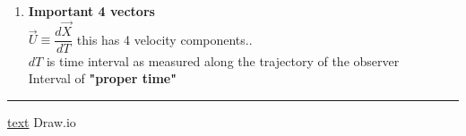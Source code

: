 \documentclass[11pt,a4paper]{article}
\begin{document}
\begin{enumerate}
\begin{enumerate}
\begin{enumerate}
                              \item \textbf{Important 4 vectors}\\
                              $\vec{U}\equiv  \dfrac{d\vec{X}}{dT}$ this has 4 velocity components..\\
                              $dT$ is time interval as measured along the trajectory of the observer \\
                              Interval of \textbf{"proper time"}\\
                              
                    \end{enumerate}
          \end{enumerate}
\end{enumerate}
\noindent\rule{\textwidth}{1pt}
\href{https://youtu.be/TiHHz3sKDbY?list=PL6Q1107aDr%SgQ1DBEugejXLfQX76hfSnX&t=1188}{text} Draw.io
\end{document}
